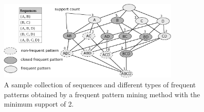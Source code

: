 \begin{figure}
\centering
\includegraphics[width=0.8\textwidth]{figures/fpm.eps}
\caption{A sample collection of sequences and different types of frequent patterns obtained by a frequent pattern mining method with the minimum support of 2.}
\label{fig:fpm}
\end{figure}


